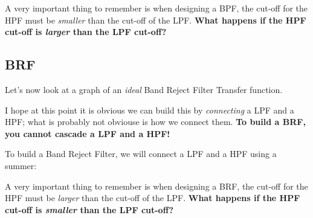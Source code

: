 \documentclass{handout}
\begin{document}
A very important thing to remember is when designing a BPF, the cut-off for the HPF must be {\em smaller} than the cut-off of the LPF.  \textbf{What happens if the HPF cut-off is {\em larger} than the LPF cut-off?}  

\subsection{BRF}
Let's now look at a graph of an {\em ideal} Band Reject Filter Transfer function.


I hope at this point it is obvious we can build this by {\em connecting} a LPF and a HPF; what is probably not obviouse is how we connect them.  \textbf{To build a BRF, you cannot cascade a LPF and a HPF!}

To build a Band Reject Filter, we will connect a LPF and a HPF using a summer:


A very important thing to remember is when designing a BRF, the cut-off for the HPF must be {\em larger} than the cut-off of the LPF.  \textbf{What happens if the HPF cut-off is {\em smaller} than the LPF cut-off?}  
\end{document}
